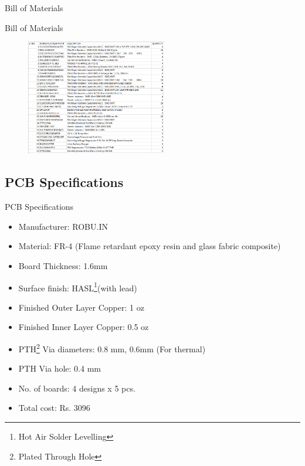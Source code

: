 \documentclass[aspectratio=169]{beamer}
\begin{document}
		\begin{section}{Bill of Materials}
			\begin{frame}{Bill of Materials}
				\begin{figure}[h]
					\centering
					\includegraphics[width=0.55\textwidth]{diag/compx.png}
				\end{figure}
			\end{frame}
	\section{PCB Specifications}	
				\begin{frame}{PCB Specifications}
			\begin{itemize}
				\item Manufacturer: ROBU.IN
				\item Material: FR-4 (Flame retardant epoxy resin and glass fabric composite)
				\item Board Thickness: 1.6mm
				\item Surface finish: HASL{\footnote{Hot Air Solder Levelling}}(with lead)
				\item Finished Outer Layer Copper: 1 oz
				\item Finished Inner Layer Copper: 0.5 oz
				\item PTH{\footnote{Plated Through Hole}} Via diameters: 0.8 mm, 0.6mm (For thermal)	
				\item PTH Via hole: 0.4 mm
				\item No. of boards: 4 designs x 5 pcs.
				\item Total cost: Rs. 3096
			\end{itemize}
		\end{frame}
			
\end{section}
\end{document}
